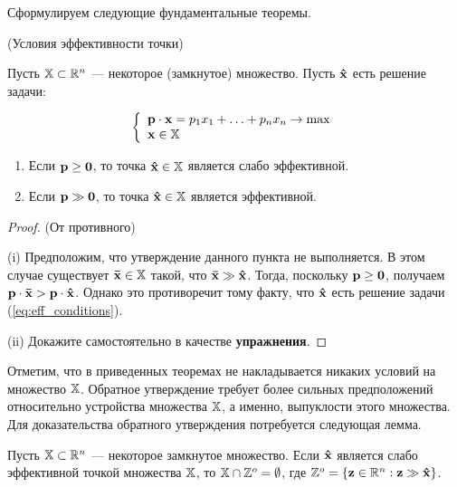 Сформулируем следующие фундаментальные теоремы.

\begin{teop}(Условия эффективности точки)\label{teo:1_fund_production}

Пусть $\mathbb{X} \subset \mathbb{R}^n$ --- некоторое (замкнутое) множество.
Пусть $\mathbf{\hat x}$ есть решение задачи:

\begin{equation}\label{eq:eff_conditions}
\left\{ \begin{array}{l}
 \mathbf{p} \cdot \mathbf{x} = p_1x_1 + \ldots + p_n x_n\to \max  \\
 \mathbf{x} \in \mathbb{X} \\
 \end{array} \right.
\end{equation}


\begin{enumerate}
\renewcommand{\theenumi}{(\roman{enumi})}
  \item Если $\mathbf{p} \geq \mathbf{0}$, то точка $\mathbf{\hat x} \in \mathbb{X}$ является
  слабо эффективной.
  \item Если $\mathbf{p} \gg \mathbf{0}$, то точка $\mathbf{\hat x} \in \mathbb{X}$ является
  эффективной.
\end{enumerate}

\end{teop}

\begin{proof}(От противного)

(i) Предположим, что утверждение данного пункта не выполняется. В
этом случае существует $\mathbf{\bar x} \in \mathbb{X}$ такой, что $\mathbf{\bar
x} \gg \mathbf{\hat x}$. Тогда, поскольку $\mathbf{p} \geq \mathbf{0}$, получаем
$\mathbf{p} \cdot \mathbf{\bar x} > \mathbf{p} \cdot \mathbf{\hat x}$. Однако это
противоречит тому факту, что $\mathbf{\hat x}$ есть решение задачи
(\ref{eq:eff_conditions}).

(ii) Докажите самостоятельно в качестве \textbf{упражнения}.

\end{proof}



Отметим, что в приведенных теоремах не накладывается никаких условий
на множество $\mathbb{X}$. Обратное утверждение требует более сильных
предположений относительно устройства множества $\mathbb{X}$, а именно,
выпуклости этого множества. Для доказательства обратного утверждения
потребуется следующая лемма.

\begin{lem}

Пусть $\mathbb{X} \subset \mathbb{R}^n$ --- некоторое замкнутое множество. Если
$\mathbf{\hat x}$ является слабо эффективной точкой множества $\mathbb{X}$,
то $\mathbb{X} \cap \mathbb{Z}^o=\emptyset$, где $\mathbb{Z}^o=\{\mathbf{z} \in
\mathbb{R}^n: \mathbf{z} \gg \mathbf{\hat x}\}$.\end{lem}

